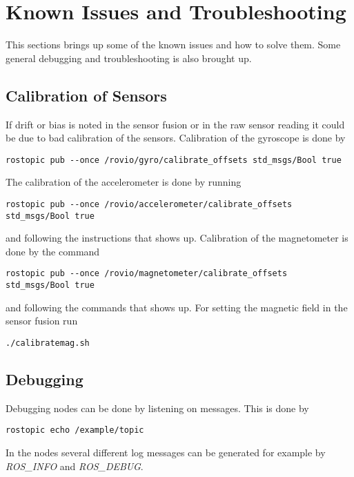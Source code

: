 \section{Known Issues and Troubleshooting}
This sections brings up some of the known issues and how to solve them. Some general debugging and troubleshooting is also brought up.

\subsection{Calibration of Sensors}
If drift or bias is noted in the sensor fusion or in the raw sensor reading it could be due to bad calibration of the sensors.
Calibration of the gyroscope is done by
\begin{lstlisting}
rostopic pub --once /rovio/gyro/calibrate_offsets std_msgs/Bool true
\end{lstlisting}
The calibration of the accelerometer is done by running
\begin{lstlisting}
rostopic pub --once /rovio/accelerometer/calibrate_offsets std_msgs/Bool true
\end{lstlisting}
and following the instructions that shows up.
Calibration of the magnetometer is done by the command
\begin{lstlisting}
rostopic pub --once /rovio/magnetometer/calibrate_offsets std_msgs/Bool true
\end{lstlisting}
and following the commands that shows up.
For setting the magnetic field in the sensor fusion run 
\begin{lstlisting}
./calibratemag.sh
\end{lstlisting}

\subsection{\abbrROS Debugging}
Debugging \abbrROS nodes can be done by listening on \abbrROS messages. This is done by 
\begin{lstlisting}
rostopic echo /example/topic
\end{lstlisting}
In the nodes several different log messages can be generated for example by \textit{ROS\_INFO} and \textit{ROS\_DEBUG}.

